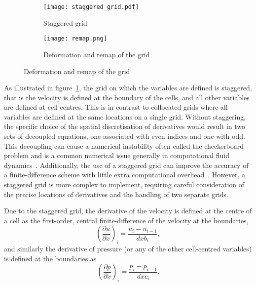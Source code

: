 \begin{figure}[t]
    \hfill
    \begin{subfigure}{0.3\textwidth}
      \centering
      \texttt{[image: staggered\_grid.pdf]}
      \caption{Staggered grid}%
      \label{fig:staggered_grid}
    \end{subfigure}
    \hfill
    \begin{subfigure}{0.49\textwidth}
      \texttt{[image: remap.png]}
      \caption{Deformation and remap of the grid}%
      \label{fig:remap}
    \end{subfigure}
\label{fig:grid_and_remap}%
\end{figure}

As illustrated in figure~\ref{fig:staggered_grid}, the grid on which the variables are defined is staggered, that is the velocity is defined at the boundary of the cells, and all other variables are defined at cell centres. This is in contrast to collocated grids where all variables are defined at the same locations on a single grid. Without staggering, the specific choice of the spatial discretisation of derivatives would result in two sets of decoupled equations, one associated with even indices and one with odd. This decoupling can cause a numerical instability often called the checkerboard problem and is a common numerical issue generally in computational fluid dynamics~\cite{ferzigerComputationalMethodsFluid2002}. Additionally, the use of a staggered grid can improve the accuracy of a finite-difference scheme with little extra computational overhead~\cite{rojanaratanangkulePerformanceHighOrder2015}. However, a staggered grid is more complex to implement, requiring careful consideration of the precise locations of derivatives and the handling of two separate grids. 

Due to the staggered grid, the derivative of the velocity is defined at the centre of a cell as the first-order, central finite-difference of the velocity at the boundaries,
\begin{equation}
  {\left( \frac{\partial u}{\partial x} \right)}_i = \frac{u_i - u_{i-1}}{dxb_i},
  \label{}
\end{equation}
and similarly the derivative of pressure (or any of the other cell-centred variables) is defined at the boundaries as
\begin{equation}
  {\left( \frac{\partial p}{\partial x} \right)}_i = \frac{p_i - p_{i-1}}{dxc_i}.
  \label{}
\end{equation}


